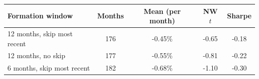 \begin{tabular}{lcccc}
\toprule
Formation window & Months & Mean (per month) & NW $t$ & Sharpe \\
\midrule
12 months, skip most recent & 176 & -0.45\% & -0.65 & -0.18 \\
12 months, no skip & 177 & -0.55\% & -0.81 & -0.22 \\
6 months, skip most recent & 182 & -0.68\% & -1.10 & -0.30 \\
\bottomrule
\end{tabular}
